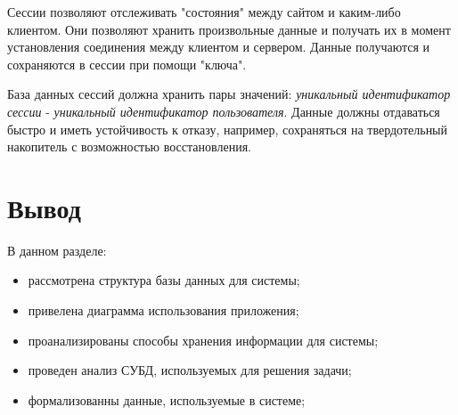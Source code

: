 Сессии\cite{sessions} позволяют отслеживать "состояния" между сайтом и каким-либо клиентом.
Они позволяют хранить произвольные данные и получать их в момент установления соединения между клиентом и сервером.
Данные получаются и сохраняются в сессии при помощи "ключа".

База данных сессий должна хранить пары значений: \textit{уникальный идентификатор сессии} - \textit{уникальный идентификатор пользователя}.
Данные должны отдаваться быстро и иметь устойчивость к отказу, например, сохраняться на твердотельный накопитель с возможностью восстановления.

\section*{Вывод}

В данном разделе:

\begin{itemize}
    \item рассмотрена структура базы данных для системы;
    \item привелена диаграмма использования приложения;
    \item проанализированы способы хранения информации для системы;
    \item проведен анализ СУБД, используемых для решения задачи;
    \item формализованны данные, используемые в системе;
\end{itemize}
